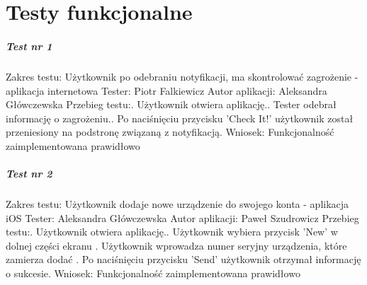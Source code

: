\chapter{Testy funkcjonalne}

\paragraph{Test nr 1}
Zakres testu:\newline
Użytkownik po odebraniu notyfikacji, ma skontrolować zagrożenie - aplikacja internetowa\newline
Tester: Piotr Falkiewicz\newline
Autor aplikacji: Aleksandra Główczewska\newline
Przebieg testu:. Użytkownik otwiera aplikację.. Tester odebrał informację o zagrożeniu.. Po naciśnięciu przycisku 'Check It!' użytkownik został przeniesiony na podstronę związaną z notyfikacją.\newline
Wniosek:\newline
Funkcjonalność zaimplementowana prawidłowo\newline
\newline

\paragraph{Test nr 2}
Zakres testu:\newline
Użytkownik dodaje nowe urządzenie do swojego konta - aplikacja iOS\newline
Tester: Aleksandra Główczewska \newline
Autor aplikacji: Paweł Szudrowicz \newline
Przebieg testu:. Użytkownik otwiera aplikację.. Użytkownik wybiera przycisk 'New' w dolnej części ekranu . Użytkownik wprowadza numer seryjny urządzenia, które zamierza dodać . Po naciśnięciu przycisku 'Send' użytkownik otrzymał informację o sukcesie.\newline
Wniosek:\newline
Funkcjonalność zaimplementowana prawidłowo\newline
\newline
 
